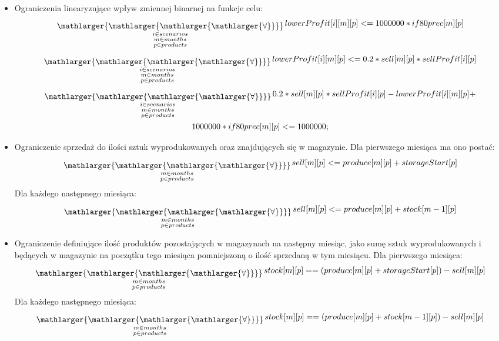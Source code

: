 \documentclass[11pt,a4paper]{article}
\newcommand\bigforall{%
  \mathop{\lower0.75ex\hbox{\ensuremath{%
    \mathlarger{\mathlarger{\mathlarger{\mathlarger{\forall}}}}}}}%
  \limits}
\begin{document}
\begin{itemize}
	\item Ograniczenia linearyzujące wpływ zmiennej binarnej na funkcje celu:
	\begin{equation}
		\bigforall_{\substack{
			i \in scenarios\\			
			m \in months\\ 
			p \in products}} lowerProfit[i][m][p] <= 1000000 * if80prec[m][p]
	\end{equation}
	\begin{equation}
		\bigforall_{\substack{
			i \in scenarios\\			
			m \in months\\ 
			p \in products}} lowerProfit[i][m][p] <= 0.2 * sell[m][p]*sellProfit[i][p]
	\end{equation}
	\begin{multline}
		\bigforall_{\substack{
			i \in scenarios\\			
			m \in months\\ 
			p \in products}} 0.2 * sell[m][p]*sellProfit[i][p] - lowerProfit[i][m][p] +\\ 1000000 * if80prec[m][p] <= 1000000;
	\end{multline}
	
	\item Ograniczenie sprzedaż do ilości sztuk wyprodukowanych oraz znajdujących się w magazynie. Dla pierwszego miesiąca ma ono postać:
	\begin{equation}
		\bigforall_{\substack{
			m \in months\\ 
			p \in products}} sell[m][p] <= produce[m][p]+storageStart[p]
	\end{equation}
	Dla każdego następnego miesiąca:
	\begin{equation}
		\bigforall_{\substack{
			m \in months\\ 
			p \in products}} sell[m][p] <= produce[m][p] + stock[m-1][p]
	\end{equation}
	
	\item Ograniczenie definiujące ilość produktów pozostających w magazynach na następny miesiąc, jako sumę sztuk wyprodukowanych i będących w magazynie na początku tego miesiąca pomniejszoną o ilość sprzedaną w tym miesiącu. Dla pierwszego miesiąca:
	\begin{equation}
		\bigforall_{\substack{
			m \in months\\ 
			p \in products}} stock[m][p]==(produce[m][p] + storageStart[p])-sell[m][p]
	\end{equation}
	Dla każdego następnego miesiąca:
	\begin{equation}
		\bigforall_{\substack{
			m \in months\\ 
			p \in products}} stock[m][p]==(produce[m][p] + stock[m-1][p])-sell[m][p]
	\end{equation}

\end{itemize}
\end{document}
